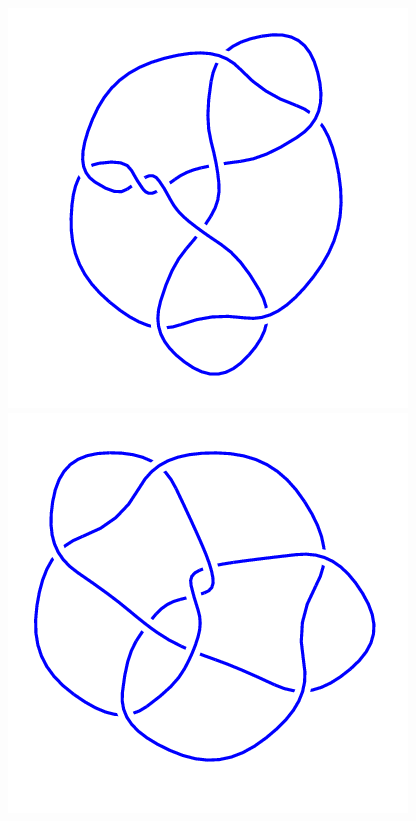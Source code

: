 \begin{figure}[H]
\begin{minipage}[b]{.18\linewidth}
    \end{minipage}
    \begin{minipage}[b]{.18\linewidth}
        \centering
        \includegraphics[width=\linewidth]{../data/9_48.png}
    \end{minipage}
    \begin{minipage}[b]{.18\linewidth}
        \centering
        \includegraphics[width=\linewidth]{../data/9_49.png}

\end{minipage}
\end{figure}
